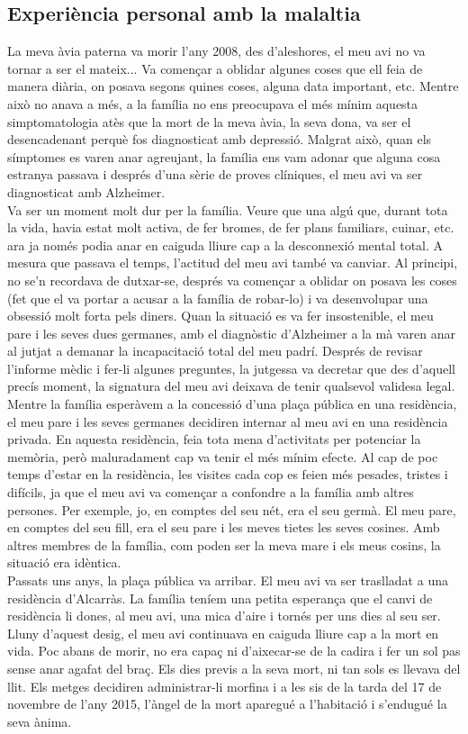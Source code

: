 \documentclass[a4paper,12pt]{article}
\begin{document}
\subsection*{Experiència personal amb la malaltia}
La meva àvia paterna va morir l'any 2008, des d'aleshores, el meu avi no va tornar a ser el mateix... Va començar a oblidar algunes coses que ell feia de manera diària, on posava segons quines coses, alguna data important, etc. Mentre això no anava a més, a la família no ens preocupava el més mínim aquesta simptomatologia atès que la mort de la meva àvia, la seva dona, va ser el desencadenant perquè fos diagnosticat amb depressió. Malgrat això, quan els símptomes es varen anar agreujant, la família ens vam adonar que alguna cosa estranya passava i després d'una sèrie de proves clíniques, el meu avi va ser diagnosticat amb Alzheimer.\\
Va ser un moment molt dur per la família. Veure que una algú que, durant tota la vida, havia estat molt activa, de fer bromes, de fer plans familiars, cuinar, etc. ara ja només podia anar en caiguda lliure cap a la desconnexió mental total. A mesura que passava el temps, l'actitud del meu avi també va canviar. Al principi, no se'n recordava de dutxar-se, després va començar a oblidar on posava les coses (fet que el va portar a acusar a la família de robar-lo) i va desenvolupar una obsessió molt forta pels diners. Quan la situació es va fer insostenible, el meu pare i les seves dues germanes, amb el diagnòstic d'Alzheimer a la mà varen anar al jutjat a demanar la incapacitació total del meu padrí. Després de revisar l'informe mèdic i fer-li algunes preguntes, la jutgessa va decretar que des d'aquell precís moment, la signatura del meu avi deixava de tenir qualsevol validesa legal.\\
Mentre la família esperàvem a la concessió d'una plaça pública en una residència, el meu pare i les seves germanes decidiren internar al meu avi en una residència privada. En aquesta residència, feia tota mena d'activitats per potenciar la memòria, però maluradament cap va tenir el més mínim efecte. Al cap de poc temps d'estar en la residència, les visites cada cop es feien més pesades, tristes i difícils, ja que el meu avi va començar a confondre a la família amb altres persones. Per exemple, jo, en comptes del seu nét, era el seu germà. El meu pare, en comptes del seu fill, era el seu pare i les meves tietes les seves cosines. Amb altres membres de la família, com poden ser la meva mare i els meus cosins, la situació era idèntica.\\
Passats uns anys, la plaça pública va arribar. El meu avi va ser traslladat a una residència d'Alcarràs. La família teníem una petita esperança que el canvi de residència li dones, al meu avi, una mica d'aire i tornés per uns dies al seu ser. Lluny d'aquest desig, el meu avi continuava en caiguda lliure cap a la mort en vida. Poc abans de morir, no era capaç ni d'aixecar-se de la cadira i fer un sol pas sense anar agafat del braç. Els dies previs a la seva mort, ni tan sols es llevava del llit. Els metges decidiren administrar-li morfina i a les sis de la tarda del 17 de novembre de l'any 2015, l'àngel de la mort aparegué a l'habitació i s'endugué la seva ànima.
\end{document}
